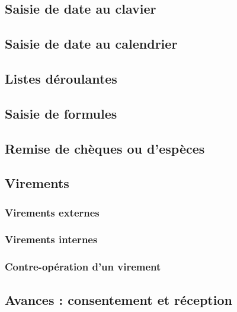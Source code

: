 \subsection{Saisie de date au clavier\label{transactions-new-dates}}


\subsection{Saisie de date au calendrier\label{transactions-new-calendar}}


\subsection{Listes déroulantes\label{transactions-new-lists}}


\subsection{Saisie de formules\label{transactions-new-numbers}}

\subsection{Remise de chèques ou d'espèces\label{transactions-new-cheque}}


\subsection{Virements\label{transactions-new-transfer}}


\subsubsection{Virements externes\label{transactions-new-transfer-external}}

\subsubsection{Virements internes\label{transactions-new-transfer-internal}}

\subsubsection{Contre-opération d'un virement\label{transactions-new-transfer-associatedOperation}}

\subsection{Avances : consentement et réception\label{transactions-new-advance}}

